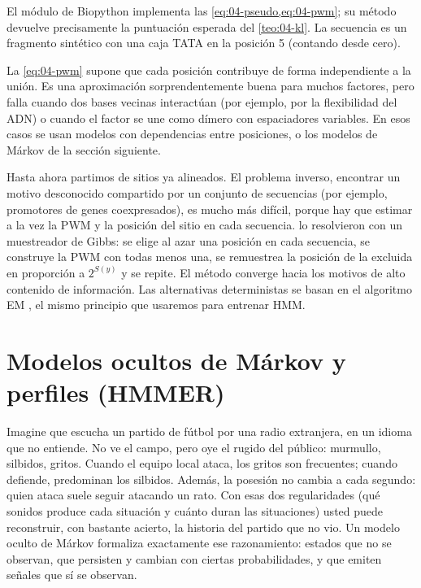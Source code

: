 \noindent El módulo  de Biopython \parencite{c04-cock2009} implementa las \cref{eq:04-pseudo,eq:04-pwm}; su método  devuelve precisamente la puntuación esperada del \cref{teo:04-kl}. La secuencia  es un fragmento sintético con una caja TATA en la posición 5 (contando desde cero).

\begin{cuidado}
La \cref{eq:04-pwm} supone que cada posición contribuye de forma independiente a la unión. Es una aproximación sorprendentemente buena para muchos factores, pero falla cuando dos bases vecinas interactúan (por ejemplo, por la flexibilidad del ADN) o cuando el factor se une como dímero con espaciadores variables. En esos casos se usan modelos con dependencias entre posiciones, o los modelos de Márkov de la sección siguiente.
\end{cuidado}

\begin{profundizacion}
Hasta ahora partimos de sitios ya alineados. El problema inverso, encontrar un motivo desconocido compartido por un conjunto de secuencias (por ejemplo, promotores de genes coexpresados), es mucho más difícil, porque hay que estimar a la vez la PWM y la posición del sitio en cada secuencia. \textcite{c04-lawrence1993} lo resolvieron con un muestreador de Gibbs: se elige al azar una posición en cada secuencia, se construye la PWM con todas menos una, se remuestrea la posición de la excluida en proporción a $2^{S(y)}$ y se repite. El método converge hacia los motivos de alto contenido de información. Las alternativas deterministas se basan en el algoritmo EM \parencite{c04-dempster1977}, el mismo principio que usaremos para entrenar HMM.
\end{profundizacion}

\section{Modelos ocultos de Márkov y perfiles (HMMER)}\label{sec:04-hmm}

\begin{intuicion}
Imagine que escucha un partido de fútbol por una radio extranjera, en un idioma que no entiende. No ve el campo, pero oye el rugido del público: murmullo, silbidos, gritos. Cuando el equipo local ataca, los gritos son frecuentes; cuando defiende, predominan los silbidos. Además, la posesión no cambia a cada segundo: quien ataca suele seguir atacando un rato. Con esas dos regularidades (qué sonidos produce cada situación y cuánto duran las situaciones) usted puede reconstruir, con bastante acierto, la historia del partido que no vio. Un modelo oculto de Márkov formaliza exactamente ese razonamiento: estados que no se observan, que persisten y cambian con ciertas probabilidades, y que emiten señales que sí se observan.
\end{intuicion}


